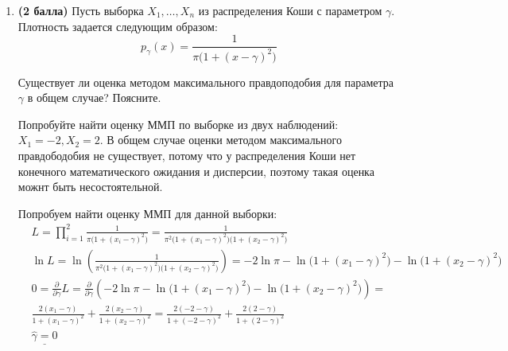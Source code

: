 \documentclass{assignment}
\begin{document}
\begin{enumerate}
    \item \textbf{(2 балла)} Пусть выборка $X_1, \ldots, X_n$ из  распределения Коши с параметром $\gamma$. 
    Плотность задается следующим образом:
    $$
    p_{\gamma}(x) = \frac{1}{\pi \big(1 + (x - \gamma)^2\big)}
    $$

    Существует ли оценка методом максимального правдоподобия для параметра $\gamma$ в общем случае? Поясните.

    Попробуйте найти оценку ММП по выборке из двух наблюдений: $X_1 = -2, X_2 = 2$.
    \start
    В общем случае оценки методом максимального правдободобия не существует, потому что у распределения Коши нет конечного математического ожидания и дисперсии, поэтому такая оценка можнт быть несостоятельной.

    Попробуем найти оценку ММП для данной выборки:
    \begin{align*}
        &L = \prod_{i=1}^{2} \frac{1}{\pi \big(1 + (x_i - \gamma)^2\big)} = \frac{1}{\pi^2 \big(1 + (x_1 - \gamma)^2\big)\big(1 + (x_2 - \gamma)^2\big)} \\
        &\ln L = \ln (\frac{1}{\pi^2 \big(1 + (x_1 - \gamma)^2\big)\big(1 + (x_2 - \gamma)^2\big)}) = - 2\ln\pi - \ln \big(1 + (x_1 - \gamma)^2\big) - \ln \big(1 + (x_2 - \gamma)^2\big) \\
        &0 = \frac{\partial}{\partial \gamma} L = \frac{\partial}{\partial \gamma} (- 2\ln\pi - \ln \big(1 + (x_1 - \gamma)^2\big) - \ln \big(1 + (x_2 - \gamma)^2\big)) = \\
        &\frac{2(x_1 - \gamma)}{1 + (x_1 - \gamma)^2} + \frac{2(x_2 - \gamma)}{1 + (x_2 - \gamma)^2} = \frac{2(-2 - \gamma)}{1 + (-2 - \gamma)^2} + \frac{2(2 - \gamma)}{1 + (2 - \gamma)^2} \\
        &\underline{\hat{\gamma} = 0}
    \end{align*}
    \finish
\end{enumerate}
    
\end{document}
